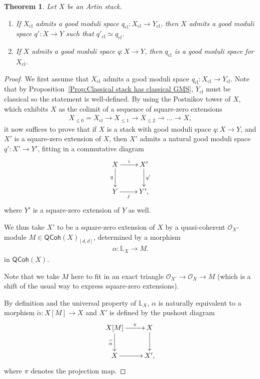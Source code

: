 \documentclass[a4paper,twoside,11pt]{amsart}
\theoremstyle{plain}
\newtheorem{theorem}{Theorem}[section]
\theoremstyle{definition}
\theoremstyle{remark}
\numberwithin{equation}{section}
\newcommand{\QCoh}{\mathsf{QCoh}}
\newcommand{\cl}{\mathrm{cl}} %
\newcommand{\lr}{\longrightarrow}
\newcommand{\oO}{\mathcal{O}}
\renewcommand{\tilde}{\widetilde}
\newcommand{\BL}{{\mathbb{L}}}
\begin{document}
\begin{theorem}
\label{Thm:GMSvsGMScl}
Let $X$ be an Artin stack. 
\begin{enumerate}
    \item If $X_\cl$ admits a good moduli space $q_\cl \colon X_\cl \to Y_\cl$, then $X$ admits a good moduli space $q' \colon X \to Y$ such that $q'_\cl \simeq q_\cl$.
    \item If $X$ admits a good moduli space $q\colon X \to Y$, then $q_\cl$ is a good moduli space for $X_\cl$.
\end{enumerate}
\end{theorem}

\begin{proof}
We first assume that $X_\cl$ admits a good moduli space $q_\cl \colon X_\cl \to Y_\cl$. Note that by Proposition~\ref{Prop:Classical stack has classical GMS}, $Y_\cl$ must be classical so the statement is well-defined. By using the Postnikov tower of $X$, which exhibits $X$ as the colimit of a sequence of square-zero extensions 
\begin{align*} 
X_{\leq 0} = X_\cl \lr X_{\leq 1} \lr X_{\leq 2} \lr \ldots \lr X,
\end{align*}
it now suffices to prove that if $X$ is a stack with good moduli space $q \colon X \to Y$, and $X'$ is a square-zero extension of $X$, then $X'$ admits a natural good moduli space $q' \colon X' \to Y'$, fitting in a commutative diagram
\begin{align} \label{eq:3.5}
    \xymatrix{
    X \ar[r]^-{i} \ar[d]_-{q} & X' \ar[d]^-{q'} \\
    Y \ar[r]_-{j} & Y',
    }
\end{align}
where $Y'$ is a square-zero extension of $Y$ as well.

We thus take $X'$ to be a square-zero extension of $X$ by a quasi-coherent $\oO_{X}$-module $M \in \QCoh(X)_{[d,d]}$, determined by a morphism
\begin{align} \label{eq:3.1}
    \alpha \colon \BL_{X} \lr M.
\end{align} 
in $\QCoh(X)$.

Note that we take $M$ here to fit in an exact triangle $\oO_{X'} \to \oO_X \to M$ (which is a shift of the usual way to express square-zero extensions).

By definition and the universal property of $\BL_X$, $\alpha$ is naturally equivalent to a morphism $\tilde{\alpha} \colon X[M] \to X$ and $X'$ is defined by the pushout diagram
\begin{align} \label{eq:3.2}
    \xymatrix{
    X[M] \ar[r]^-{\pi} \ar[d]_-{\tilde{\alpha}} & X \ar[d] \\
    X \ar[r] & X',
    }
\end{align}
where $\pi$ denotes the projection map.


\end{proof}
\end{document}
